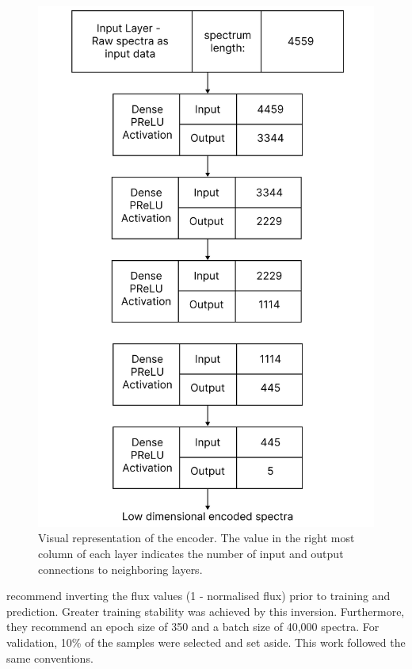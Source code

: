 \begin{figure}[!htb]
\centering
\includegraphics[scale=0.13]{figures/autoencoder diagram.png}
\caption{Visual representation of the encoder. The value in
the right most column of each layer indicates the number of input and output
connections to neighboring layers.}
\end{figure}

\citet{vcotar2021galah} recommend inverting the flux values (1 - normalised flux) prior to training and prediction. Greater training stability was achieved by this inversion. Furthermore, they recommend an epoch size of 350 and a batch size of 40,000 spectra. For validation, 10\% of the samples were selected and set aside. This work followed the same conventions. 

